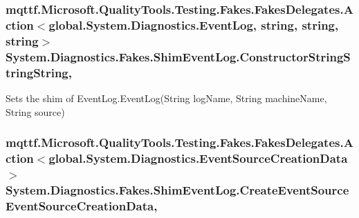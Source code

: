 \hypertarget{class_system_1_1_diagnostics_1_1_fakes_1_1_shim_event_log_ac82d6d97acfe945b77dcf65e3ea7fea3}{
\subsubsection[{Constructor\-String\-String\-String}]{\setlength{\rightskip}{0pt plus 5cm}mqttf.\-Microsoft.\-Quality\-Tools.\-Testing.\-Fakes.\-Fakes\-Delegates.\-Action$<$global.\-System.\-Diagnostics.\-Event\-Log, string, string, string$>$ System.\-Diagnostics.\-Fakes.\-Shim\-Event\-Log.\-Constructor\-String\-String\-String\hspace{0.3cm}{\ttfamily [static]}, {\ttfamily [set]}}}\label{class_system_1_1_diagnostics_1_1_fakes_1_1_shim_event_log_ac82d6d97acfe945b77dcf65e3ea7fea3}


Sets the shim of Event\-Log.\-Event\-Log(\-String log\-Name, String machine\-Name, String source)

\hypertarget{class_system_1_1_diagnostics_1_1_fakes_1_1_shim_event_log_af618875f98faaddb947e192e1fe7558c}{
\subsubsection[{Create\-Event\-Source\-Event\-Source\-Creation\-Data}]{\setlength{\rightskip}{0pt plus 5cm}mqttf.\-Microsoft.\-Quality\-Tools.\-Testing.\-Fakes.\-Fakes\-Delegates.\-Action$<$global.\-System.\-Diagnostics.\-Event\-Source\-Creation\-Data$>$ System.\-Diagnostics.\-Fakes.\-Shim\-Event\-Log.\-Create\-Event\-Source\-Event\-Source\-Creation\-Data\hspace{0.3cm}{\ttfamily [static]}, {\ttfamily [set]}}}\label{class_system_1_1_diagnostics_1_1_fakes_1_1_shim_event_log_af618875f98faaddb947e192e1fe7558c}


